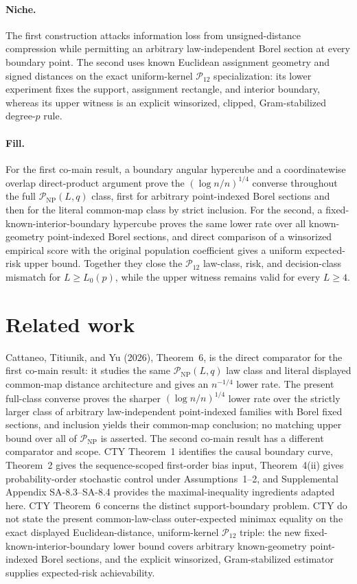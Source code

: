 \documentclass{article}
\begin{document}
\paragraph{Niche.} The first construction attacks information loss from unsigned-distance compression while permitting an arbitrary law-independent Borel section at every boundary point.  The second uses known Euclidean assignment geometry and signed distances on the exact uniform-kernel \(\mathcal P_{12}\) specialization: its lower experiment fixes the support, assignment rectangle, and interior boundary, whereas its upper witness is an explicit winsorized, clipped, Gram-stabilized degree-\(p\) rule.

\paragraph{Fill.} For the first co-main result, a boundary angular hypercube and a coordinatewise overlap direct-product argument prove the \((\log n/n)^{1/4}\) converse throughout the full \(\mathcal P_{\mathrm{NP}}(L,q)\) class, first for arbitrary point-indexed Borel sections and then for the literal common-map class by strict inclusion.  For the second, a fixed-known-interior-boundary hypercube proves the same lower rate over all known-geometry point-indexed Borel sections, and direct comparison of a winsorized empirical score with the original population coefficient gives a uniform expected-risk upper bound.  Together they close the \(\mathcal P_{12}\) law-class, risk, and decision-class mismatch for \(L\geq L_0(p)\), while the upper witness remains valid for every \(L\geq4\).

\section{Related work}

Cattaneo, Titiunik, and Yu (2026), Theorem~6, is the direct comparator for the first co-main result: it studies the same \(\mathcal P_{\mathrm{NP}}(L,q)\) law class and literal displayed common-map distance architecture and gives an \(n^{-1/4}\) lower rate.  The present full-class converse proves the sharper \((\log n/n)^{1/4}\) lower rate over the strictly larger class of arbitrary law-independent point-indexed families with Borel fixed sections, and inclusion yields their common-map conclusion; no matching upper bound over all of \(\mathcal P_{\mathrm{NP}}\) is asserted.  The second co-main result has a different comparator and scope.  CTY Theorem~1 identifies the causal boundary curve, Theorem~2 gives the sequence-scoped first-order bias input, Theorem~4(ii) gives probability-order stochastic control under Assumptions~1--2, and Supplemental Appendix SA-8.3--SA-8.4 provides the maximal-inequality ingredients adapted here.  CTY Theorem~6 concerns the distinct support-boundary problem.  CTY do not state the present common-law-class outer-expected minimax equality on the exact displayed Euclidean-distance, uniform-kernel \(\mathcal P_{12}\) triple: the new fixed-known-interior-boundary lower bound covers arbitrary known-geometry point-indexed Borel sections, and the explicit winsorized, Gram-stabilized estimator supplies expected-risk achievability.
\end{document}
